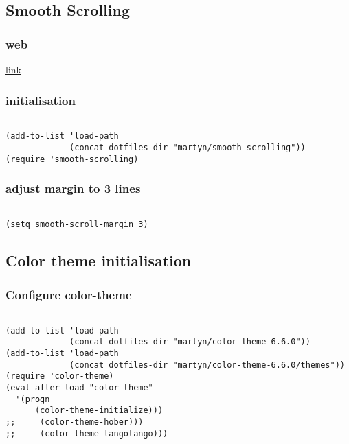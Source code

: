 \documentclass[colorlinks=true,urlcolor=blue,listings-sv]{article}
\begin{document}
\subsection{Smooth Scrolling}
\label{sec-1-14}
\subsubsection{web}
\label{sec-1-14-1}


\href{http://adamspiers.org/computing/elisp/smooth-scrolling.el}{link}
\subsubsection{initialisation}
\label{sec-1-14-2}
\label{42144f41-08ac-4f3d-825e-94d4a87a20c1}




\lstset{language=Lisp}
\begin{lstlisting}

(add-to-list 'load-path
             (concat dotfiles-dir "martyn/smooth-scrolling"))
(require 'smooth-scrolling)
\end{lstlisting}
\subsubsection{adjust margin to 3 lines}
\label{sec-1-14-3}


\lstset{language=Lisp}
\begin{lstlisting}

(setq smooth-scroll-margin 3)
\end{lstlisting}
\subsection{Color theme initialisation}
\label{sec-1-15}
\subsubsection{Configure color-theme}
\label{sec-1-15-1}



\lstset{language=Lisp}
\begin{lstlisting}

(add-to-list 'load-path
             (concat dotfiles-dir "martyn/color-theme-6.6.0"))
(add-to-list 'load-path
             (concat dotfiles-dir "martyn/color-theme-6.6.0/themes"))
(require 'color-theme)
(eval-after-load "color-theme"
  '(progn
      (color-theme-initialize)))
;;     (color-theme-hober)))
;;     (color-theme-tangotango)))
\end{lstlisting}
\end{document}

